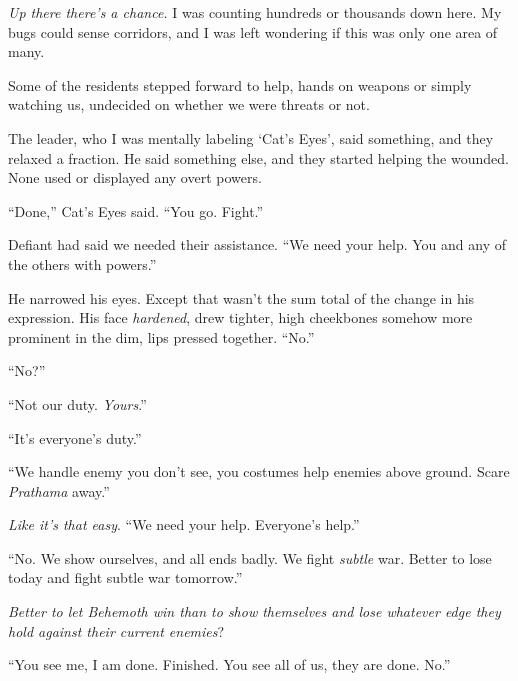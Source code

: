 \emph{Up there there's a chance.}  I was counting hundreds or thousands down here.  My bugs could sense corridors, and I was left wondering if this was only one area of many.



Some of the residents stepped forward to help, hands on weapons or simply watching us, undecided on whether we were threats or not.



The leader, who I was mentally labeling `Cat's Eyes', said something, and they relaxed a fraction.  He said something else, and they started helping the wounded.  None used or displayed any overt powers.



``Done,'' Cat's Eyes said.  ``You go.  Fight.''



Defiant had said we needed their assistance.  ``We need your help.  You and any of the others with powers.''



He narrowed his eyes.  Except that wasn't the sum total of the change in his expression.  His face \emph{hardened}, drew tighter, high cheekbones somehow more prominent in the dim, lips pressed together.  ``No.''



``No?''



``Not our duty.  \emph{Yours}.''



``It's everyone's duty.''



``We handle enemy you don't see, you costumes help enemies above ground.  Scare \emph{Prathama} away.''



\emph{Like it's that easy}.  ``We need your help.  Everyone's help.''



``No.  We show ourselves, and all ends badly.  We fight \emph{subtle} war.  Better to lose today and fight subtle war tomorrow.''



\emph{Better to let Behemoth win than to show themselves and lose whatever edge they hold against their current enemies}?



``You see me, I am done.  Finished.  You see all of us, they are done.  No.''



